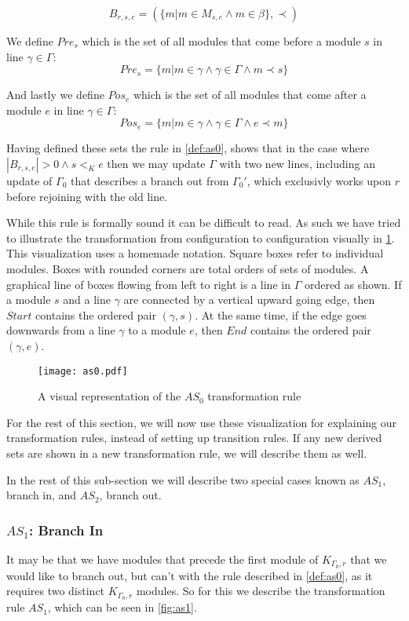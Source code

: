 \[B_{r,s,e} = (\{m |m \in M_{s,e} \land m \in \beta\}, \prec)\]

We define $Pre_{s}$ which is the set of all modules that come before a module $s$ in line $\gamma \in \Gamma$:
\[Pre_{s} = \{m | m \in \gamma \land \gamma \in \Gamma \land m \prec s\}\]

And lastly we define $Pos_{e}$ which is the set of all modules that come after a module $e$  in line $\gamma \in \Gamma$:
\[Pos_{e} = \{m | m \in \gamma \land \gamma \in \Gamma \land e \prec  m \}\]

Having defined these sets the rule in \cref{def:as0}, shows that in the case where $|B_{r,s,e}| > 0 \land s <_K e$ then we may update $\Gamma$ with two new lines, including an update of $\Gamma_0$ that describes a branch out from $\Gamma_0'$, which exclusivly works upon $r$ before rejoining with the old line.   

While this rule is formally sound it can be difficult to read. As such we have tried to illustrate the transformation from configuration to configuration visually in \cref{fig:as0}. This visualization uses a homemade notation. Square boxes refer to individual modules. Boxes with rounded corners are total orders of sets of modules. A graphical line of boxes flowing from left to right is a line in $\Gamma$ ordered as shown. If a module $s$ and a line $\gamma$ are connected by a vertical upward going edge, then $Start$ contains the ordered pair $(\gamma ,s)$. At the same time, if the edge goes downwards from a line $\gamma$ to a module $e$, then $End$ contains the ordered pair $(\gamma ,e)$.


\begin{figure}[H]
\centering
\texttt{[image: as0.pdf]}
\caption{A visual representation of the $AS_0$ transformation rule}
\label{fig:as0}
\end{figure}

For the rest of this section, we will now use these visualization for explaining our transformation rules, instead of setting up transition rules. If any new derived sets are shown in a new transformation rule, we will describe them as well.  

In the rest of this sub-section we will describe two special cases known as $AS_1$, branch in, and $AS_2$,  branch out. 

\subsubsection{$AS_1$: Branch In}\label{sssec:bi}
It may be that we have modules that precede the first module of $K_{\Gamma_0 ,r}$ that we would like to branch out, but can't with the rule described in \cref{def:as0}, as it requires two distinct $K_{\Gamma_0 ,r}$ modules. So for this we describe the transformation rule $AS_1$, which can be seen in \cref{fig:as1}.

